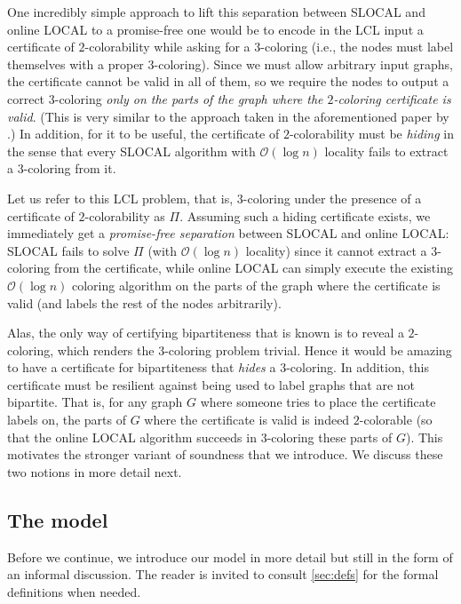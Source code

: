 \documentclass[11pt]{article}
\newcommand*{\cO}{\mathcal{O}}
\begin{document}
One incredibly simple approach to lift this separation between SLOCAL and online
LOCAL to a promise-free one would be to encode in the LCL input a certificate of
$2$-colorability while asking for a $3$-coloring (i.e., the nodes must label
themselves with a proper $3$-coloring).
Since we must allow arbitrary input graphs, the certificate cannot be valid in
all of them, so we require the nodes to output a correct $3$-coloring \emph{only
on the parts of the graph where the $2$-coloring certificate is valid}.
(This is very similar to the approach taken in the aforementioned paper by
\textcite{balliu24_shared_arxiv}.)
In addition, for it to be useful, the certificate of $2$-colorability must be
\emph{hiding} in the sense that every SLOCAL algorithm with $\cO(\log n)$
locality fails to extract a $3$-coloring from it.

Let us refer to this LCL problem, that is, $3$-coloring under the presence of a
certificate of $2$-colorability as $\Pi$.
Assuming such a hiding certificate exists, we immediately get a
\emph{promise-free separation} between SLOCAL and online LOCAL:
SLOCAL fails to solve $\Pi$ (with $\cO(\log n)$ locality) since it cannot
extract a $3$-coloring from the certificate, while online LOCAL can simply
execute the existing $\cO(\log n)$ coloring algorithm on the parts of the graph
where the certificate is valid (and labels the rest of the nodes arbitrarily).

Alas, the only way of certifying bipartiteness that is known is to reveal a
$2$-coloring, which renders the $3$-coloring problem trivial.
Hence it would be amazing to have a certificate for bipartiteness that
\emph{hides} a $3$-coloring.
In addition, this certificate must be resilient against being used to label
graphs that are not bipartite.
That is, for any graph $G$ where someone tries to place the certificate labels
on, the parts of $G$ where the certificate is valid is indeed $2$-colorable (so
that the online LOCAL algorithm succeeds in $3$-coloring these parts of $G$).
This motivates the stronger variant of soundness that we introduce.
We discuss these two notions in more detail next.

\subsection{The model}
\label{sec:intro-model}

Before we continue, we introduce our model in more detail but still in the form
of an informal discussion.
The reader is invited to consult \cref{sec:defs} for the formal definitions when
needed.
\end{document}
